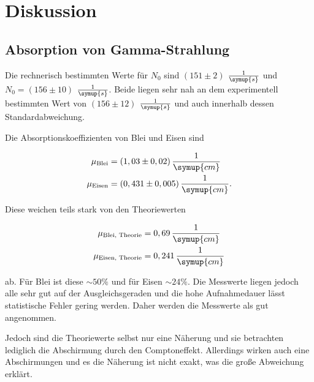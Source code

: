 \section{Diskussion}
\label{sec:Diskussion}

\subsection{Absorption von Gamma-Strahlung}

Die rechnerisch bestimmten Werte für $N_0$ sind $(151 \pm 2)$ $\frac{1}{\symup{s}}$ und $N_0 = (156 \pm 10)$ $\frac{1}{\symup{s}}$. 
Beide liegen sehr nah an dem experimentell bestimmten Wert von $(156 \pm 12)$ $\frac{1}{\symup{s}}$ und auch innerhalb dessen Standardabweichung.

Die Absorptionskoeffizienten von Blei und Eisen sind

\begin{align*}
    \mu_\text{Blei} &= (1,03 \pm 0,02) \, \frac{1}{\symup{cm}}\\
    \mu_\text{Eisen} &= (0,431 \pm 0,005) \, \frac{1}{\symup{cm}}.
\end{align*}

Diese weichen teils stark von den Theoriewerten

\begin{align*}
    \mu_\text{Blei, Theorie} &= 0,69 \, \frac{1}{\symup{cm}}\\
    \mu_\text{Eisen, Theorie} &= 0,241 \, \frac{1}{\symup{cm}}
\end{align*}

ab. Für Blei ist diese $\sim \! 50\%$ und für Eisen $\sim \! 24\%$.
Die Messwerte liegen jedoch alle sehr gut auf der Ausgleichsgeraden und die hohe Aufnahmedauer lässt statistische Fehler gering werden.
Daher werden die Messwerte als gut angenommen.

Jedoch sind die Theoriewerte selbst nur eine Näherung und sie betrachten lediglich die Abschirmung durch den Comptoneffekt.
Allerdings wirken auch eine Abschirmungen und es die Näherung ist nicht exakt, was die große Abweichung erklärt.